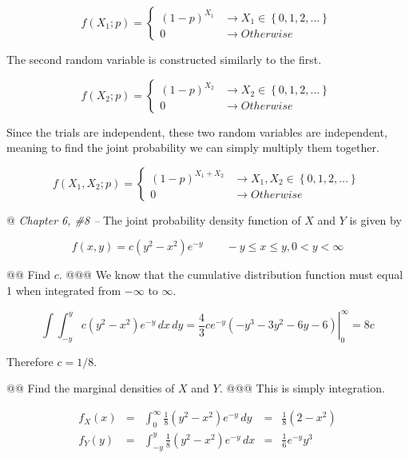 \documentclass[11pt]{article}\usepackage[]{graphicx}\usepackage[]{xcolor}
\begin{document}
\begin{easylist}[enumerate]
    \[
        f(X_1; p) =
        \begin{cases}
            { \left( 1 - p \right)}^{X_1} & \to {X_1} \in { \left\{ 0, 1, 2, \ldots \right\} }\\
            0 &\to Otherwise
        \end{cases}
    \]

    The second random variable is constructed similarly to the first.

    \[
        f(X_2; p) =
        \begin{cases}
            { \left( 1 - p \right)}^{X_2} & \to {X_2} \in { \left\{ 0, 1, 2, \ldots \right\} }\\
            0 &\to Otherwise
        \end{cases}
    \]

    Since the trials are independent, these two random variables are independent, meaning to find the joint probability
    we can simply multiply them together.

    \[
        f(X_1, X_2; p) =
        \begin{cases}
            { \left( 1 - p \right)}^{X_1 + X_2} & \to X_1, X_2 \in { \left\{ 0, 1, 2, \ldots \right\} }\\
            0 &\to Otherwise
        \end{cases}
    \]

    @ \textit{Chapter 6, \#8 --} The joint probability density function of $X$ and $Y$ is given by

    \[
        f(x, y) = c (y^2 - x^2) e^{-y} \qquad -y \le x \le y, 0 < y < \infty
    \]

    @@ Find $c$.
    @@@ We know that the cumulative distribution function must equal 1 when integrated from $-\infty$ to $\infty$.

    \[
        \int \int_{-y}^y c (y^2 - x^2) e^{-y} \, dx \, dy =
        \left. \frac{4}{3} c e^{-y} \left(-y^3-3 y^2-6 y-6\right) \right|^\infty_0 =
        8c
    \]

    Therefore $\boxed{c = 1/8}$.

    @@ Find the marginal densities of $X$ and $Y$.
    @@@ This is simply integration.

    \[
        \begin{aligned}
            f_X(x) &=& \int_0^\infty
            \frac{1}{8} (y^2 - x^2) e^{-y}
            \, dy &=& \frac{1}{8} \left(2 - x^2\right)\\
            f_Y(y) &=& \int_{-y}^y
            \frac{1}{8} (y^2 - x^2) e^{-y}
            \, dx &=& \frac{1}{6} e^{-y} y^3
        \end{aligned}
    \]


\end{easylist}
\end{document}
